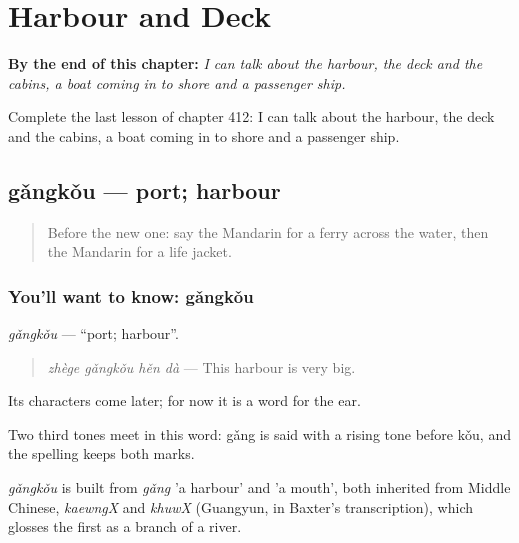 
\chapter{Harbour and Deck}
\label{ch:zh-harbour-and-deck}

\begin{chapteropening}
\textbf{By the end of this chapter:} \emph{I can talk about the harbour, the deck and the cabins, a boat coming in to shore and a passenger ship.}

Complete the last lesson of chapter 412: I can talk about the harbour, the deck and the cabins, a boat coming in to shore and a passenger ship.
\end{chapteropening}

\section[gǎngkǒu]{gǎngkǒu — port; harbour}

\label{lesson:ZH-C412-gangkou}



\begin{quote}
Before the new one: say the Mandarin for a ferry across the water, then the Mandarin for a life jacket.
\end{quote}

\subsection*{You'll want to know: gǎngkǒu}
\emph{gǎngkǒu} — \textquotedblleft{}port; harbour\textquotedblright{}.

\begin{quote}
\emph{zhège gǎngkǒu hěn dà} — This harbour is very big.
\end{quote}

Its characters come later; for now it is a word for the ear.

Two third tones meet in this word: gǎng is said with a rising tone before kǒu, and the spelling keeps both marks.

\begin{cousinweb}
\emph{gǎngkǒu} is built from \emph{gǎng} 'a harbour' and  'a mouth', both inherited from Middle Chinese, \emph{kaewngX} and \emph{khuwX} (Guangyun, in Baxter's transcription), which glosses the first as a branch of a river.
\end{cousinweb}

